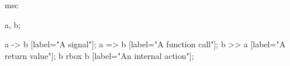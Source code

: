 \begin{msc}
	msc{
        	a, b;

        	a -> b [label="A signal"];
        	a => b [label="A function call"];
        	b >> a [label="A return value"];
        	b rbox b [label="An internal action"];

	}
\end{msc}

